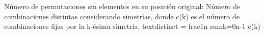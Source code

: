 {}\markdownRendererInterblockSeparator
{}
\markdownRendererSectionEnd \markdownRendererSectionBegin
{}\markdownRendererInterblockSeparator
{}Número de permutaciones sin elementos en su posición original:\markdownRendererInterblockSeparator
{}\markdownRendererInterblockSeparator
{}
\markdownRendererSectionEnd \markdownRendererSectionBegin
{}\markdownRendererInterblockSeparator
{}Número de combinaciones distintas considerando simetrías, donde \markdownRendererDollarSign{}c(k)\markdownRendererDollarSign{} es el número de combinaciones fijas por la k-ésima simetría.\markdownRendererParagraphSeparator
{}\markdownRendererDollarSign{}\markdownRendererDollarSign{}\markdownRendererBackslash{}text\markdownRendererLeftBrace{}\markdownRendererHash{}distinct\markdownRendererRightBrace{} = \markdownRendererBackslash{}frac\markdownRendererLeftBrace{}1\markdownRendererRightBrace{}\markdownRendererLeftBrace{}n\markdownRendererRightBrace{} \markdownRendererBackslash{}sum\markdownRendererUnderscore{}\markdownRendererLeftBrace{}k=0\markdownRendererRightBrace{}\markdownRendererCircumflex{}\markdownRendererLeftBrace{}n-1\markdownRendererRightBrace{} c(k)\markdownRendererDollarSign{}\markdownRendererDollarSign{}\markdownRendererInterblockSeparator
{}
\markdownRendererSectionEnd 
\markdownRendererSectionEnd \markdownRendererDocumentEnd